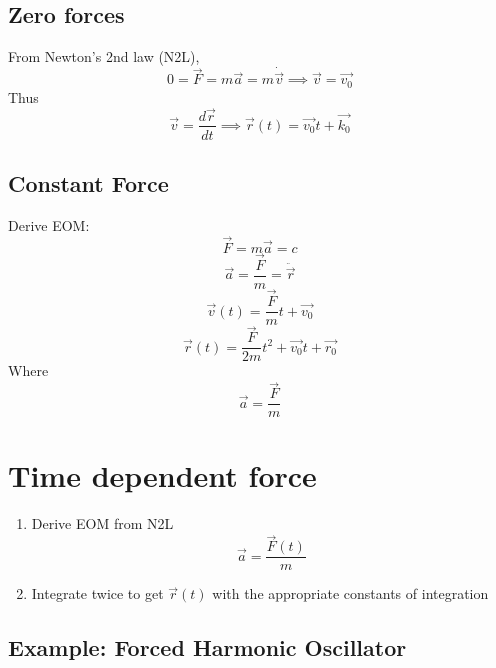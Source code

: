 \documentclass{article}
\newtheorem{one minute paper}[theorem]{One Minute Paper}
\begin{document}
\subsection*{Zero forces}

From Newton's 2nd law (N2L),
\begin{equation}
    0 = \vec{F} = m\vec{a} = m\dot{\vec{v}} \implies \vec{v} = \vec{v_0}
\end{equation}
Thus
\begin{equation}
    \vec{v} = \frac{d\vec{r}}{dt} \implies \vec{r}(t) = \vec{v_0}t + \vec{k_0} 
\end{equation}

\subsection*{Constant Force}

Derive EOM:
\begin{equation}
    \vec{F} = m\vec{a} = c
\end{equation}
\begin{equation}
    \vec{a} = \frac{\vec{F}}{m} = \ddot{\vec{r}}
\end{equation}
\begin{equation}
    \vec{v}(t) = \frac{\vec{F}}{m}t + \vec{v_0}
\end{equation}
\begin{equation}
    \vec{r}(t) = \frac{\vec{F}}{2m}t^2 + \vec{v_0}t + \vec{r_0}
\end{equation}
Where
\begin{equation}
    \vec{a} = \frac{\vec{F}}{m}
\end{equation}

\newpage

\section*{Time dependent force}
\begin{enumerate}
    \item Derive EOM from N2L
    \begin{equation}
        \vec{a} = \frac{\vec{F}(t)}{m}
    \end{equation}
    \item Integrate twice to get $\vec{r}(t)$ with the appropriate constants of integration
\end{enumerate}

\subsection*{Example: Forced Harmonic Oscillator}
\end{document}
